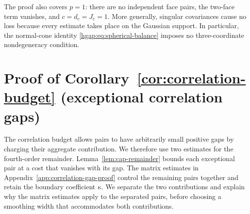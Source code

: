 \documentclass[11pt,letterpaper]{article}
\theoremstyle{remark}
\begin{document}
The proof also covers $p=1$: there are no independent face pairs, the
two-face term vanishes, and $c=d_c=J_c=1$. More generally, singular
covariances cause no loss because every estimate takes place on the
Gaussian support. In particular, the normal-cone identity
\eqref{hgap:eq:spherical-balance} imposes no three-coordinate
nondegeneracy condition.


\clearpage
\section{Proof of Corollary~\ref*{cor:correlation-budget} (exceptional correlation gaps)}
\label{app:correlation-budget}

The correlation budget allows pairs to have arbitrarily small
positive gaps by charging their aggregate contribution. We therefore use two estimates for the fourth-order
remainder. Lemma~\ref{lem:cap-remainder} bounds each exceptional pair
at a cost that vanishes with its gap. The matrix estimates in
Appendix~\ref{app:correlation-gap-proof} control the remaining pairs
together and retain the boundary coefficient $\kappa$. We separate
the two contributions and explain why the matrix estimates apply to
the separated pairs, before choosing a smoothing width that
accommodates both contributions.
\end{document}
